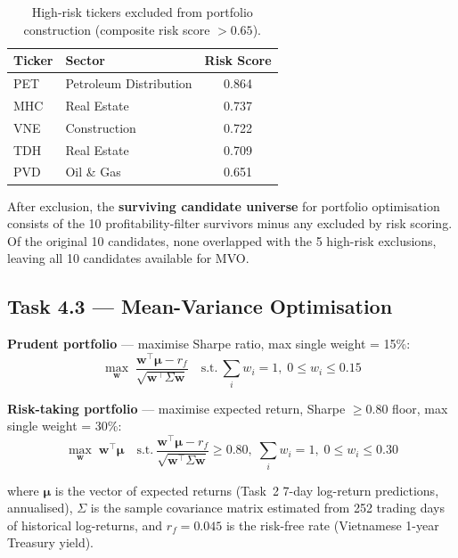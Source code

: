 \documentclass[12pt, a4paper]{article}
\begin{document}
\begin{table}[h]
\centering
\caption{High-risk tickers excluded from portfolio construction
         (composite risk score $> 0.65$).}
\label{tab:excluded}
\renewcommand{\arraystretch}{1.3}
\begin{tabular}{llc}
\hline
\textbf{Ticker} & \textbf{Sector} & \textbf{Risk Score} \\
\hline
PET & Petroleum Distribution & 0.864 \\
MHC & Real Estate            & 0.737 \\
VNE & Construction           & 0.722 \\
TDH & Real Estate            & 0.709 \\
PVD & Oil \& Gas             & 0.651 \\
\hline
\end{tabular}
\end{table}

After exclusion, the \textbf{surviving candidate universe} for
portfolio optimisation consists of the 10 profitability-filter
survivors minus any excluded by risk scoring. Of the original
10 candidates, none overlapped with the 5 high-risk exclusions,
leaving all 10 candidates available for MVO.

\subsection{Task 4.3 --- Mean-Variance Optimisation}

\textbf{Prudent portfolio} --- maximise Sharpe ratio, max single weight = 15\%:
\begin{equation}
\max_{\mathbf{w}} \; \frac{\mathbf{w}^\top \boldsymbol{\mu} - r_f}
                          {\sqrt{\mathbf{w}^\top \Sigma \mathbf{w}}}
\quad \text{s.t.}\ \sum_i w_i = 1,\; 0 \leq w_i \leq 0.15
\end{equation}

\textbf{Risk-taking portfolio} --- maximise expected return, Sharpe $\geq 0.80$
floor, max single weight = 30\%:
\begin{equation}
\max_{\mathbf{w}} \; \mathbf{w}^\top \boldsymbol{\mu}
\quad \text{s.t.}\ \frac{\mathbf{w}^\top \boldsymbol{\mu} - r_f}
                        {\sqrt{\mathbf{w}^\top \Sigma \mathbf{w}}} \geq 0.80,\;
\sum_i w_i = 1,\; 0 \leq w_i \leq 0.30
\label{eq:mvo_return}
\end{equation}


where $\boldsymbol{\mu}$ is the vector of expected returns (Task~2
7-day log-return predictions, annualised), $\Sigma$ is the sample
covariance matrix estimated from 252 trading days of historical
log-returns, and $r_f = 0.045$ is the risk-free rate (Vietnamese
1-year Treasury yield).
\end{document}
